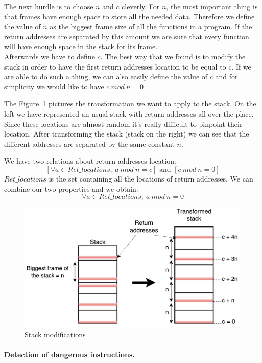 \documentclass[11pt]{sdm}
\begin{document}
The next hurdle is to choose $n$ and $c$ cleverly. 
For $n$, the most important thing is that frames have enough space to store all the needed data. Therefore we define the value of $n$ as the biggest frame size of all the functions in a program.
If the return addresses are separated by this amount we are sure that every function will have enough space in the stack for its frame. \\
Afterwards we have to define $c$. The best way that we found is to modify the stack in order to have the first return addresses location to be equal to $c$. If we are able to do such a thing, we can also easily define the value of $c$ and for simplicity we would like to have $c~mod~n = 0$

The Figure~\ref{idea_stack} pictures the transformation we want to apply to the stack. On the left we have represented an usual stack with return addresses all over the place.
Since these locations are almost random it's really difficult to pinpoint their location. After transforming the stack (stack on the right) we can see that the different addresses are separated by the same constant $n$.

We have two relations about return addresses location:
$$[\forall a\in Ret\_locations,~a~mod~n=c]\text{ and }[c~mod~n=0]$$
$Ret\_locations$ is the set containing all the locations of return addresses.
We can combine our two properties and we obtain:
{\Large $$\forall a\in Ret\_locations,~a~mod~n=0$$}



\begin{figure}[!ht]
\centering
\includegraphics[scale=0.6]{images/idea_stack.pdf}
\caption{Stack modifications}
\label{idea_stack}
\end{figure}

\paragraph{Detection of dangerous instructions.}
\label{par:Detection of dangerous instructions}
\end{document}
